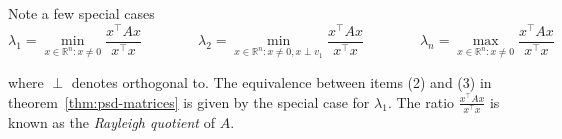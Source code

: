 Note a few special cases
\begin{equation*}
\lambda_1 = \min_{x \in \mathbb{R}^n : x \neq 0} \frac{x^\top Ax}{x^\top x}
\qquad\qquad
\lambda_2 = \min_{x \in \mathbb{R}^n : x \neq 0, x \perp v_1} \frac{x^\top Ax}{x^\top x}
\qquad\qquad
\lambda_n = \max_{x \in \mathbb{R}^n : x \neq 0} \frac{x^\top Ax}{x^\top x}
\end{equation*}

where $\perp$ denotes orthogonal to. The equivalence between items (2) and (3) in theorem~\ref{thm:psd-matrices} is given by the special case for $\lambda_1$. The ratio $\frac{x^\top Ax}{x^\top x}$ is known as the \emph{Rayleigh quotient} of $A$.
